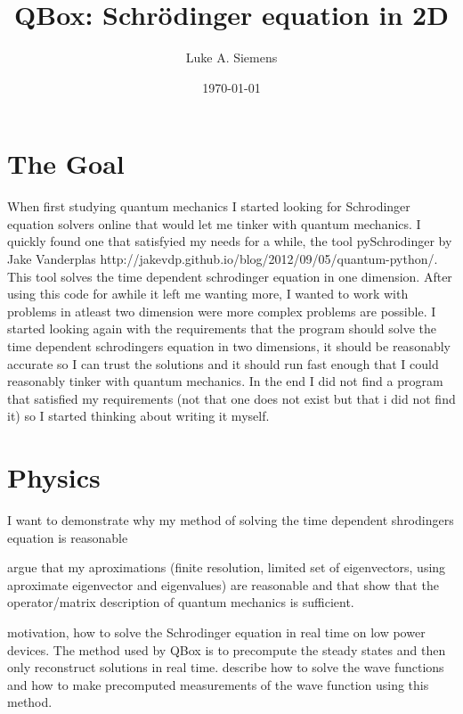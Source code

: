 \documentclass[%
 preprint,
 amsmath, amssymb, aps, pra, 10pt
]{revtex4-2}
\begin{document}
\title{QBox: Schrödinger equation in 2D}%

\author{Luke A. Siemens}
\noaffiliation

\date{\today}

\maketitle


\section{The Goal}

When first studying quantum mechanics I started looking for Schrodinger equation solvers online that would let me tinker with quantum mechanics. I quickly found one that satisfyied my needs for a while, the tool pySchrodinger by Jake Vanderplas http://jakevdp.github.io/blog/2012/09/05/quantum-python/. This tool solves the time dependent schrodinger equation in one dimension. After using this code for awhile it left me wanting more, I wanted to work with problems in atleast two dimension were more complex problems are possible. I started looking again with the requirements that the program should solve the time dependent schrodingers equation in two dimensions, it should be reasonably accurate so I can trust the solutions and it should run fast enough that I could reasonably tinker with quantum mechanics. In the end I did not find a program that satisfied my requirements (not that one does not exist but that i did not find it) so I started thinking about writing it myself.

\section{Physics}

I want to demonstrate why my method of solving the time dependent shrodingers equation is reasonable 

argue that my aproximations (finite resolution, limited set of eigenvectors, using aproximate eigenvector and eigenvalues) are reasonable and that show that the operator/matrix description of quantum mechanics is sufficient.

motivation, how to solve the Schrodinger equation in real time on low power devices. The method used by QBox is to precompute the steady states and then only reconstruct solutions in real time.
describe how to solve the wave functions and how to make precomputed measurements of the wave function using this method.
\end{document}
